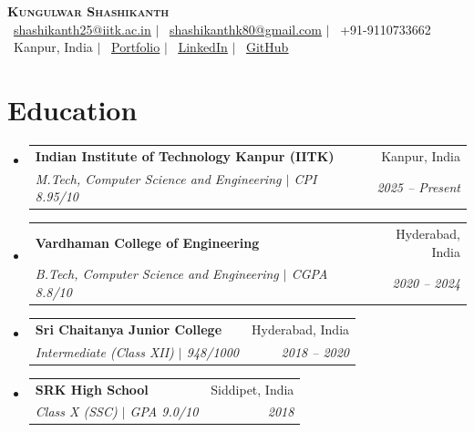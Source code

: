 \documentclass[letterpaper,11pt]{article}
\makeatletter
\newcommand{\resumeSubheading}[4]{
  \vspace{-2pt}\item
    \begin{tabular*}{0.97\textwidth}[t]{l@{\extracolsep{\fill}}r}
      \textbf{#1} & #2 \\
      \textit{\small#3} & \textit{\small #4} \\
    \end{tabular*}\vspace{-7pt}
}
\newcommand{\resumeSubHeadingListStart}{\begin{itemize}[leftmargin=0.15in, label={}]}
\newcommand{\resumeSubHeadingListEnd}{\end{itemize}}
\makeatother
\begin{document}
%
\begin{center}
    \textbf{\Huge \scshape Kungulwar Shashikanth} \\ \vspace{3pt}
    \small
    \faEnvelope\ \href{mailto:shashikanth25@iitk.ac.in}{\underline{shashikanth25@iitk.ac.in}} $|$
    \faEnvelope\ \href{mailto:shashikanthk80@gmail.com}{\underline{shashikanthk80@gmail.com}} $|$
    \faPhone*\ +91-9110733662 \\ \vspace{2pt}
    \faMapMarker*\ Kanpur, India $|$
    \faGlobe\ \href{https://shashikanthkungulwar.github.io/shashikanth.com/}{\underline{Portfolio}} $|$
    \faLinkedin\ \href{https://linkedin.com/in/shashikanth-kungulwar-8abb53368/}{\underline{LinkedIn}} $|$
    \faGithub\ \href{https://github.com/ShashikanthKungulwar}{\underline{GitHub}}
\end{center}

\section{Education}
  \resumeSubHeadingListStart
    \resumeSubheading
      {Indian Institute of Technology Kanpur (IITK)}{Kanpur, India}
      {M.Tech, Computer Science and Engineering $|$ CPI 8.95/10}{2025 -- Present}
    \resumeSubheading
      {Vardhaman College of Engineering}{Hyderabad, India}
      {B.Tech, Computer Science and Engineering $|$ CGPA 8.8/10}{2020 -- 2024}
    \resumeSubheading
      {Sri Chaitanya Junior College}{Hyderabad, India}
      {Intermediate (Class XII) $|$ 948/1000}{2018 -- 2020}
    \resumeSubheading
      {SRK High School}{Siddipet, India}
      {Class X (SSC) $|$ GPA 9.0/10}{2018}
  \resumeSubHeadingListEnd
\end{document}
